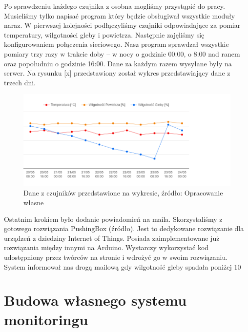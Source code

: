 \documentclass[brudnopis]{xmgr}
\begin{document}
	Po sprawdzeniu każdego czujnika z osobna mogliśmy przystąpić do pracy. Musieliśmy tylko napisać program który będzie obsługiwał wszystkie moduły naraz. W pierwszej kolejności podłączyliśmy czujniki odpowiadające za pomiar temperatury, wilgotności gleby i powietrza. Następnie zajęliśmy się konfigurowaniem połączenia sieciowego. Nasz program sprawdzał wszystkie pomiary trzy razy w trakcie doby – w nocy o godzinie 00:00, o  8:00 nad ranem oraz popołudniu o godzinie 16:00. Dane za każdym razem wysyłane były na serwer. Na rysunku [x] przedstawiony został wykres przedstawiający dane z trzech dni.

\begin{figure}[h]
\centering
\includegraphics[width=\textwidth]{pawel_wykres}
\caption{Dane z czujników przedstawione na wykresie, źródło: Opracowanie własne}
\label{fig:iot}
\end{figure}

Ostatnim krokiem było dodanie powiadomień na maila. Skorzystaliśmy z gotowego rozwiązania PushingBox (źródło). Jest to dedykowane rozwiązanie dla urządzeń z dziedziny Internet of Things. Posiada zaimplementowane już rozwiązania między innymi na Arduino.   Wystarczy wykorzystać kod udostępniony przez twórców na stronie i wdrożyć go w swoim rozwiązaniu. System informował nas drogą mailową gdy wilgotność gleby spadała poniżej 10%
\section{Budowa własnego systemu monitoringu}
\end{document}
